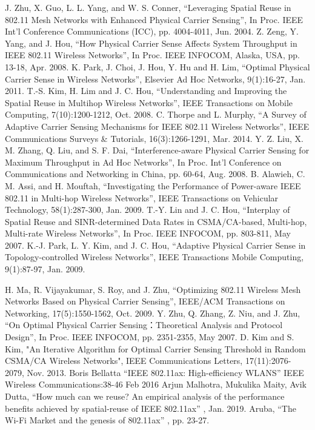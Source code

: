 \documentclass[12pt,a4paper]{article}
\begin{document}
\begin{thebibliography}{00}
 J. Zhu, X. Guo, L. L. Yang, and W. S. Conner, “Leveraging Spatial Reuse in 802.11 Mesh Networks with Enhanced Physical Carrier Sensing”, In Proc. IEEE Int’l Conference Communications (ICC), pp. 4004-4011, Jun. 2004.
 Z. Zeng, Y. Yang, and J. Hou, “How Physical Carrier Sense Affects System Throughput in IEEE 802.11 Wireless Networks”, In Proc. IEEE INFOCOM, Alaska, USA, pp. 13-18, Apr. 2008.
 K. Park, J. Choi, J. Hou, Y. Hu and H. Lim, “Optimal Physical Carrier Sense in Wireless Networks”, Elsevier Ad Hoc Networks, 9(1):16-27, Jan. 2011.
 T.-S. Kim, H. Lim and J. C. Hou, “Understanding and Improving the Spatial Reuse in Multihop Wireless Networks”, IEEE Transactions on Mobile Computing, 7(10):1200-1212, Oct. 2008.
 C. Thorpe and L. Murphy, “A Survey of Adaptive Carrier Sensing Mechanisms for IEEE 802.11 Wireless Networks”, IEEE Communications Surveys \& Tutorials, 16(3):1266-1291, Mar. 2014.
 Y. Z. Liu, X. M. Zhang, Q. Liu, and S. F. Dai, “Interference-aware Physical Carrier Sensing for Maximum Throughput in Ad Hoc Networks”, In Proc. Int’l Conference on Communications and Networking in China, pp. 60-64, Aug. 2008.
 B. Alawieh, C. M. Assi, and H. Mouftah, “Investigating the Performance of Power-aware IEEE 802.11 in Multi-hop Wireless Networks”, IEEE Transactions on Vehicular Technology, 58(1):287-300, Jan. 2009.
 T.-Y. Lin and J. C. Hou, “Interplay of Spatial Reuse and SINR-determined Data Rates in CSMA/CA-based, Multi-hop, Multi-rate Wireless Networks”, In Proc. IEEE INFOCOM, pp. 803-811, May 2007.
 K.-J. Park, L. Y. Kim, and J. C. Hou, “Adaptive Physical Carrier Sense in Topology-controlled Wireless Networks”, IEEE Transactions Mobile Computing, 9(1):87-97, Jan. 2009.


 H. Ma, R. Vijayakumar, S. Roy, and J. Zhu, “Optimizing 802.11 Wireless Mesh Networks Based on Physical Carrier Sensing”, IEEE/ACM Transactions on Networking, 17(5):1550-1562, Oct. 2009.
 Y. Zhu, Q. Zhang, Z. Niu, and J. Zhu, “On Optimal Physical Carrier Sensing：Theoretical Analysis and Protocol Design”, In Proc. IEEE INFOCOM, pp. 2351-2355,  May 2007.
 D. Kim and S. Kim, "An Iterative Algorithm for Optimal Carrier Sensing Threshold in Random CSMA/CA Wireless Networks", IEEE Communications Letters, 17(11):2076-2079, Nov. 2013.
 Boris Bellatta “IEEE 802.11ax: High-efficiency WLANS” IEEE Wireless Communications:38-46 Feb 2016
 Arjun Malhotra, Mukulika Maity, Avik Dutta,  “How much can we reuse? An empirical analysis of the performance benefits achieved by spatial-reuse of IEEE 802.11ax” , Jan. 2019.
 Aruba, “The Wi-Fi Market and the genesis of 802.11ax” , pp. 23-27.

\end{thebibliography}
\label{LastPage}
\end{document}
